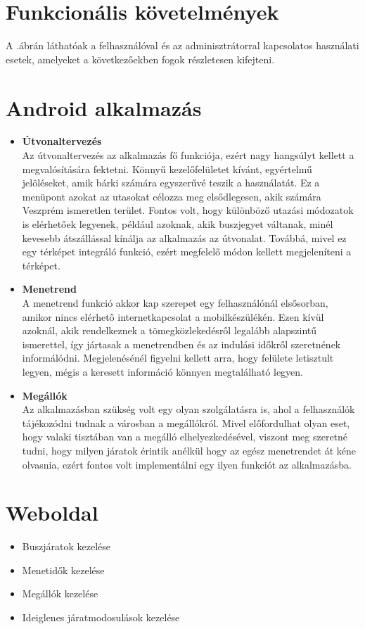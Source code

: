 \section{Funkcionális követelmények}
\label{funkckov}

A .ábrán láthatóak a felhasználóval és az adminisztrátorral kapcsolatos használati esetek, amelyeket a következőekben fogok részletesen kifejteni.

\section*{Android alkalmazás}
\begin{itemize}
	\item \textbf{Útvonaltervezés}
	\\
	Az útvonaltervezés az alkalmazás fő funkciója, ezért nagy hangsúlyt kellett a megvalósítására fektetni. 
	Könnyű kezelőfelületet kívánt, egyértelmű jelöléseket, amik bárki számára egyszerűvé teszik a használatát. 
	Ez a menüpont azokat az utasokat célozza meg elsődlegesen, akik számára Veszprém ismeretlen terület. 
	Fontos volt, hogy különböző utazási módozatok is elérhetőek legyenek, például azoknak, akik buszjegyet váltanak, minél kevesebb átszállással kínálja az alkalmazás az útvonalat. 
	Továbbá, mivel ez egy térképet integráló funkció, ezért megfelelő módon kellett megjeleníteni a térképet. 	
	\item \textbf{Menetrend}
	\\
	A menetrend funkció akkor kap szerepet egy felhasználónál elsősorban, amikor nincs elérhető internetkapcsolat a mobilkészülékén. 
	Ezen kívül azoknál, akik rendelkeznek a tömegközlekedésről legalább alapszintű ismerettel, így jártasak a menetrendben és az indulási időkről szeretnének informálódni. 
	Megjelenésénél figyelni kellett arra, hogy felülete letisztult legyen, mégis a keresett információ könnyen megtalálható legyen. %
	\item \textbf{Megállók}
	\\
	Az alkalmazásban szükség volt egy olyan szolgálatásra is, ahol a felhasználók tájékozódni tudnak a városban a megállókról. 
	Mivel előfordulhat olyan eset, hogy valaki tisztában van a megálló elhelyezkedésével, viszont meg szeretné tudni, hogy milyen járatok érintik anélkül hogy az egész menetrendet át kéne olvasnia, ezért fontos volt implementálni egy ilyen funkciót az alkalmazásba. 
\end{itemize}
\section*{Weboldal}
\begin{itemize}
	\item Buszjáratok kezelése
	\item Menetidők kezelése
	\item Megállók kezelése
	\item Ideiglenes járatmodosulások kezelése
\end{itemize}
	
